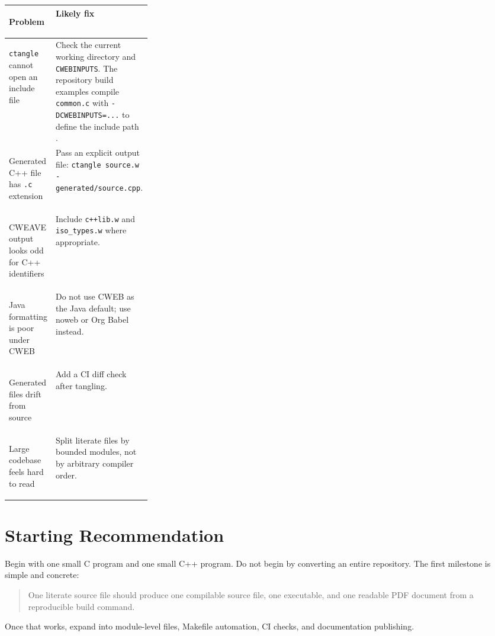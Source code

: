 \documentclass[11pt]{article}
\begin{document}
\begin{center}
\begin{tabularx}{0.96\linewidth}{>{\bfseries\raggedright\arraybackslash}p{0.28\linewidth} >{\raggedright\arraybackslash}X}
\toprule
Problem & Likely fix \\
\midrule
\texttt{ctangle} cannot open an include file & Check the current working directory and \texttt{CWEBINPUTS}. The repository build examples compile \texttt{common.c} with \texttt{-DCWEBINPUTS=...} to define the include path \cite{repo-readme}. \\
Generated C++ file has \texttt{.c} extension & Pass an explicit output file: \texttt{ctangle source.w - generated/source.cpp}. \\
CWEAVE output looks odd for C++ identifiers & Include \texttt{c++lib.w} and \texttt{iso\_types.w} where appropriate. \\
Java formatting is poor under CWEB & Do not use CWEB as the Java default; use noweb or Org Babel instead. \\
Generated files drift from source & Add a CI diff check after tangling. \\
Large codebase feels hard to read & Split literate files by bounded modules, not by arbitrary compiler order. \\
\bottomrule
\end{tabularx}
\end{center}

\section{Starting Recommendation}

Begin with one small C program and one small C++ program. Do not begin by converting an entire repository. The first milestone is simple and concrete:

\begin{quote}
One literate source file should produce one compilable source file, one executable, and one readable PDF document from a reproducible build command.
\end{quote}

Once that works, expand into module-level files, Makefile automation, CI checks, and documentation publishing.
\end{document}
